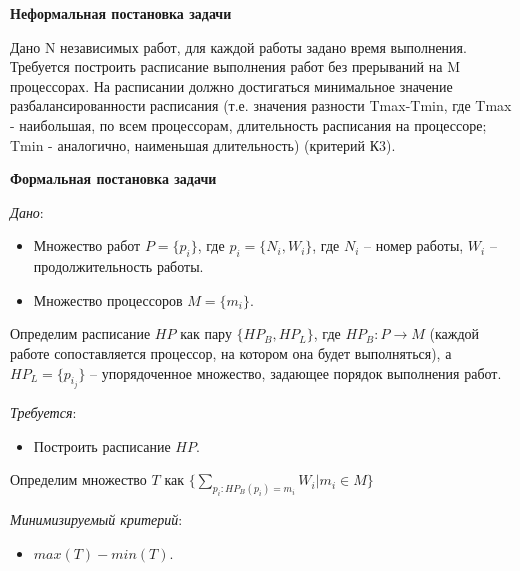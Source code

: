 \documentclass{article}
\begin{document}
\textbf{Неформальная постановка задачи}

Дано N независимых работ, для каждой работы задано время выполнения. Требуется построить расписание выполнения работ без прерываний на M процессорах. На расписании должно достигаться минимальное значение разбалансированности расписания (т.е. значения разности Tmax-Tmin, где Tmax - наибольшая, по всем процессорам, длительность расписания на процессоре; Tmin - аналогично, наименьшая длительность) (критерий К3).

\textbf{Формальная постановка задачи}

\textit{Дано}:
\begin{itemize}
\item Множество работ $P = \{p_i\}$, где $p_i = \{N_i, W_i\}$, где $N_i$ -- номер работы, $W_i$ -- продолжительность работы.
\item Множество процессоров $M = \{m_i\}$.
\end{itemize}

Определим расписание $HP$ как пару $\{HP_B, HP_L\}$, где $HP_B: P \rightarrow M$ (каждой работе сопоставляется процессор, на котором она будет выполняться), а $HP_L = \{p_{i_j}\}$ -- упорядоченное множество, задающее порядок выполнения работ.

\textit{Требуется}:
\begin{itemize}
\item Построить расписание $HP$.
\end{itemize}

Определим множество $T$ как $\{\sum\limits_{p_i: HP_B(p_i) = m_i} W_i | m_i \in M\}$

\textit{Минимизируемый критерий}:
\begin{itemize}
\item $max(T) - min(T)$.
\end{itemize}
\end{document}
